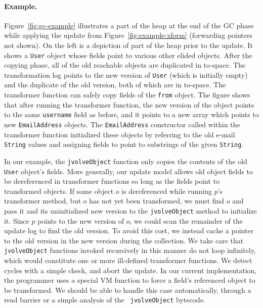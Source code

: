 \documentclass[9pt]{sigplanconf}
\begin{document}
\paragraph{Example.}
Figure~\ref{fig:gc-example} illustrates a part of the heap at the end
of the GC phase while applying the update from
Figure~\ref{fig:example-xform} (forwarding pointers not shown).  On the left is a depiction of part of the heap prior
to the update.  It shows a {\tt User} object whose fields point to
various other elided objects.  After the copying phase, all of the old
reachable objects are duplicated in to-space.  The
transformation log points to the new version of {\tt User} (which
is initially empty) and the duplicate of the old version, both of
which are in to-space.  The transformer function can safely copy
fields of the {\tt from} object. The figure shows that after
running the transformer function, the new version of the object points
to the same {\tt username} field as before, and it points to a new
array which points to new {\tt EmailAddress} objects. The
{\tt EmailAddress} constructor called within the transformer function initialized these objects by
referring to the old e-mail 
{\tt String} values and assigning fields to point to substrings of
the given {\tt String}.

In our example, the {\tt jvolveObject} function only copies the
contents of the old {\tt User} object's fields.  More generally,
our update model allows old object fields to be dereferenced in
transformer functions so long as the fields point to transformed
objects.  If some object $o$ is dereferenced while running $p$'s
transformer method, but $o$ has not yet been transformed, we must
find $o$ and pass it and its uninitialized new version to the
{\tt jvolveObject} method to initialize
it.  Since $p$ points to the new version of $o$, we could scan the
remainder of the update log to find the old version.  To avoid
this cost, we instead cache a pointer to the old
version in the new version during the collection.
We take care that {\tt jvolveObject} functions
invoked recursively in this manner do not loop infinitely,
which would constitute one or more ill-defined transformer
functions. We detect cycles with a simple check, and abort the update.
In our current implementation, the programmer uses a
special VM function to force a field's referenced object to be
transformed.  We should be able to handle this case
automatically, through a read barrier or a simple analysis of the {\tt
  jvolveObject} bytecode.  

\end{document}
